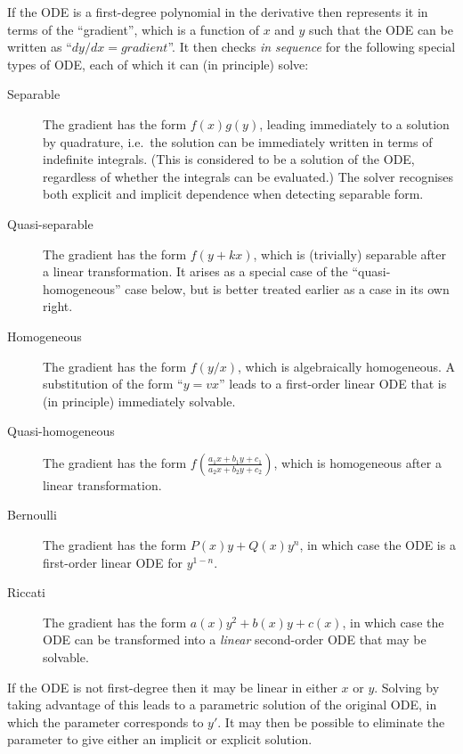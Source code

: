 If the ODE is a first-degree polynomial in the derivative then
 represents it in terms of the ``gradient'', which is a
function of $x$ and $y$ such that the ODE can be written as ``$dy/dx =
\textit{gradient}$''.  It then checks \emph{in sequence} for the
following special types of ODE, each of which it can (in principle)
solve:
\begin{description}
\item[Separable] The gradient has the form $f(x)g(y)$, leading
immediately to a solution by quadrature, i.e.\ the solution can be
immediately written in terms of indefinite integrals.  (This is
considered to be a solution of the ODE, regardless of whether the
integrals can be evaluated.)  The solver recognises both explicit and
implicit dependence when detecting separable form.

\item[Quasi-separable] The gradient has the form $f(y+kx)$, which is
(trivially) separable after a linear transformation.  It arises as a
special case of the ``quasi-homogeneous'' case below, but is better
treated earlier as a case in its own right.

\item[Homogeneous] The gradient has the form $f(y/x)$, which is
algebraically homogeneous.  A substitution of the form ``$y = vx$''
leads to a first-order linear ODE that is (in principle) immediately
solvable.

\item[Quasi-homogeneous] The gradient has the form $f\left(\frac{a_1x
  + b_1y + c_1}{a_2x + b_2y + c_2}\right)$, which is homogeneous after
  a linear transformation.

\item[Bernoulli] The gradient has the form $P(x) y + Q(x) y^n$, in
which case the ODE is a first-order linear ODE for $y^{1-n}$.

\item[Riccati] The gradient has the form $a(x)y^2 + b(x)y + c(x)$, in
which case the ODE can be transformed into a \emph{linear}
second-order ODE that may be solvable.
\end{description}

If the ODE is not first-degree then it may be linear in either $x$ or
$y$.  Solving by taking advantage of this leads to a parametric
solution of the original ODE, in which the parameter corresponds to
$y'$.  It may then be possible to eliminate the parameter to give
either an implicit or explicit solution.

